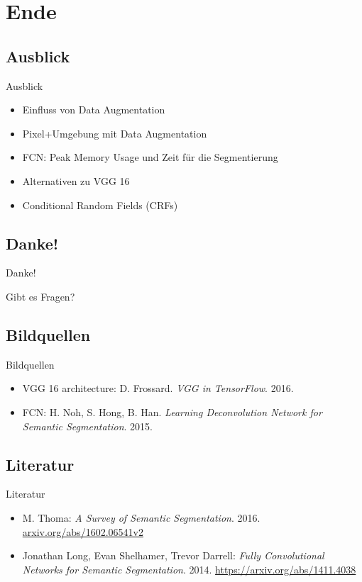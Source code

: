 \section{Ende}
\subsection{Ausblick}
\begin{frame}{Ausblick}
    \begin{itemize}
        \item Einfluss von Data Augmentation
        \item Pixel+Umgebung mit Data Augmentation
        \item FCN: Peak Memory Usage und Zeit für die Segmentierung
        \item Alternativen zu VGG 16
        \item Conditional Random Fields (CRFs)
    \end{itemize}
\end{frame}

\subsection{Danke!}
\begin{frame}{Danke!}
    \begin{center}
        \Huge
	    Gibt es Fragen?
    \end{center}
\end{frame}

\subsection{Bildquellen}
\begin{frame}{Bildquellen}
\begin{itemize}
	\item VGG 16 architecture: D. Frossard. \textit{VGG in TensorFlow}. 2016.
    \item FCN: H. Noh, S. Hong, B. Han. \textit{Learning Deconvolution Network for Semantic Segmentation}. 2015.
\end{itemize}
\end{frame}

\subsection{Literatur}
\begin{frame}{Literatur}
\begin{itemize}
    \item M. Thoma: \textit{A Survey of Semantic Segmentation}. 2016. \href{http://arxiv.org/abs/1602.06541v2}{arxiv.org/abs/1602.06541v2}
    \item Jonathan Long, Evan Shelhamer, Trevor Darrell: \textit{Fully Convolutional Networks for Semantic Segmentation}. 2014. \href{https://arxiv.org/abs/1411.4038}{https://arxiv.org/abs/1411.4038}
\end{itemize}
\end{frame}

